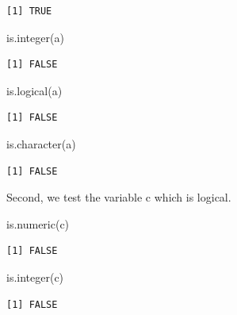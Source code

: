 \documentclass[
  letterpaper,
  DIV=11,
  numbers=noendperiod]{scrreprt}
\newenvironment{Shaded}{\begin{snugshade}}{\end{snugshade}}
\newcommand{\FunctionTok}[1]{\textcolor[rgb]{0.28,0.35,0.67}{#1}}
\newcommand{\NormalTok}[1]{\textcolor[rgb]{0.00,0.23,0.31}{#1}}
\begin{document}
\begin{verbatim}
[1] TRUE
\end{verbatim}

\begin{Shaded}
\begin{Highlighting}[]
\FunctionTok{is.integer}\NormalTok{(a)}
\end{Highlighting}
\end{Shaded}

\begin{verbatim}
[1] FALSE
\end{verbatim}

\begin{Shaded}
\begin{Highlighting}[]
\FunctionTok{is.logical}\NormalTok{(a)}
\end{Highlighting}
\end{Shaded}

\begin{verbatim}
[1] FALSE
\end{verbatim}

\begin{Shaded}
\begin{Highlighting}[]
\FunctionTok{is.character}\NormalTok{(a)}
\end{Highlighting}
\end{Shaded}

\begin{verbatim}
[1] FALSE
\end{verbatim}

Second, we test the variable c which is logical.

\begin{Shaded}
\begin{Highlighting}[]
\FunctionTok{is.numeric}\NormalTok{(c)}
\end{Highlighting}
\end{Shaded}

\begin{verbatim}
[1] FALSE
\end{verbatim}

\begin{Shaded}
\begin{Highlighting}[]
\FunctionTok{is.integer}\NormalTok{(c)}
\end{Highlighting}
\end{Shaded}

\begin{verbatim}
[1] FALSE
\end{verbatim}
\end{document}
